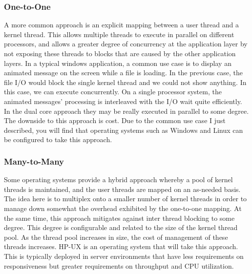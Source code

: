 \documentclass[10pt,a4paper]{article}
\begin{document}
\subsubsection{One-to-One}
A more common approach is an explicit mapping between a user thread and a kernel thread. This allows multiple threads to execute in parallel on different processors, and allows a greater degree of concurrency at the application layer by not exposing these threads to blocks that are caused by the other application layers. In a typical windows application, a common use case is to display an animated message on the screen while a file is loading. In the previous case, the file I/O would block the single kernel thread and we could not show anything. In this case, we can execute concurrently. On a single processor system, the animated messages' processing is interleaved with the I/O wait quite efficiently. In the dual core approach they may be really executed in parallel to some degree. The downside to this approach is cost. Due to the common use case I just described, you will find that operating systems such as Windows and Linux can be configured to take this approach. 
\subsubsection{Many-to-Many}
Some operating systems provide a hybrid approach whereby a pool of kernel threads is maintained, and the user threads are mapped on an as-needed basis. The idea here is to multiplex onto a smaller number of kernel threads in order to manage down somewhat the overhead exhibited by the one-to-one mapping. At the same time, this approach mitigates against inter thread blocking to some degree. This degree is configurable and related to the size of the kernel thread pool. As the thread pool increases in size, the cost of management of these threads increases. HP-UX is an operating system that will take this approach. This is typically deployed in server environments that have less requirements on responsiveness but greater requirements on throughput and CPU utilization. 
\end{document}
